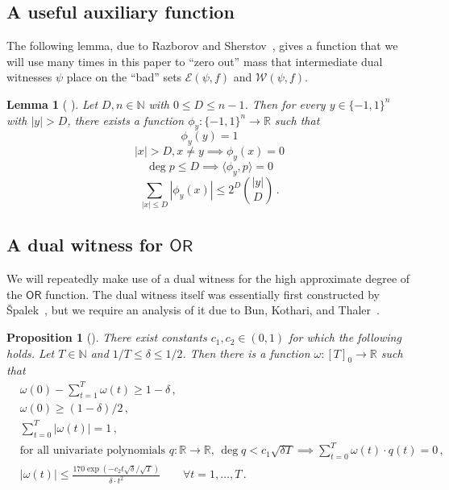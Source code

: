 \documentclass[11pt]{article}
\numberwithin{equation}{section}
\newtheorem{lemma}[theorem]{Lemma}
\newtheorem{proposition}[theorem]{Proposition}
\theoremstyle{definition}
\theoremstyle{plain}
\newcommand{\R}{\mathbb R}
\newcommand{\N}{\mathbb N}
\newcommand{\OR}{\mathsf{ OR}}
\newcommand{\bits}{\{-1,1\}}
\begin{document}
\subsection{A useful auxiliary function}
The following lemma, due to Razborov and Sherstov~\cite{razborovsherstov}, gives a function that we will use
many times in this paper to ``zero out'' mass that intermediate dual witnesses $\psi$ place
on the ``bad'' sets $\mathcal{E}(\psi, f)$ and $\mathcal{W}(\psi, f)$. 

\begin{lemma}[%
	]\label{lem:rs}
	Let $D, n \in \N$ with $0 \le D \le n - 1$. Then for every $y \in \bits^n$ with $|y| > D$, there exists a function $\phi_y: \bits^n \to \mathbb{R}$ such that
	\begin{equation}\phi_y(y) = 1	\label{eqn:rs-point}\end{equation}
	\begin{equation}|x| > D, x \ne y \implies \phi_y(x) = 0	\label{eqn:rs-hamming}\end{equation}
	\begin{equation}\deg p \le D \implies \langle \phi_y, p \rangle = 0 \label{eqn:rs-phd} \end{equation}
	\begin{equation}\sum_{|x| \le D} |\phi_y(x)| \le 2^D {|y| \choose D}\,.   \label{eqn:rs-norm} \end{equation}
\end{lemma}
%

\subsection{A dual witness for \texorpdfstring{$\OR$}{OR}}
We will repeatedly make use of a dual witness for the high approximate
degree of the $\OR$ function. The dual witness itself was essentially first constructed by {\v S}palek~\cite{spalek}, 
but we require an analysis of it due to Bun, Kothari, and Thaler~\cite{bkt}.

\begin{proposition}[\!\cite{bkt}] \label{prop:or-sym-dual}  %
	There exist constants $c_1, c_2 \in (0, 1) $ for which the following holds. Let $T \in \N$ and $1/T \le \delta \le 1/2$. Then there is a function $\omega : [T]_0 \to \R$ such that
	\begin{align}
	&\omega(0) - \sum_{t = 1}^T \omega(t) \ge 1- \delta\,,  \label{eqn:or-sym-corr}\\
	& \omega(0) \ge (1-\delta)/2\,,\\
	  &\sum_{t = 0}^T |\omega(t)| = 1\,, \\
%
	& \text{for all univariate polynomials } q \colon \R \to \R\text{, } \deg q < c_1\sqrt{\delta T} \implies \sum_{t=0}^T \omega(t) \cdot q(t) = 0\,, \label{eqn:or-sym-phd}\\
	& |\omega(t)| \le \frac{170 \exp(-c_2 t \sqrt{\delta} /  \sqrt{T})}{\delta \cdot t^2} \qquad \forall t = 1, \dots, T\,.\label{eqn:or-sym-decay}\end{align}
\end{proposition}
\end{document}
